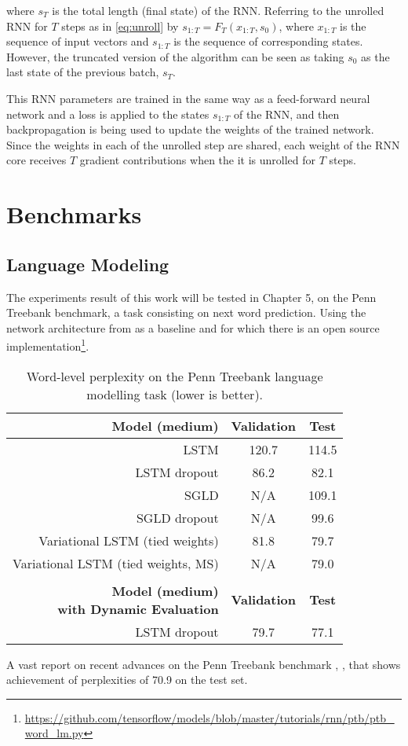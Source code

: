 where $s_T$ is the total length (final state) of the RNN.
Referring to the unrolled RNN for $T$ steps as in \eqref{eq:unroll} by $s_{1:T} = F_T(x_{1:T}, s_0)$,
where $x_{1:T}$ is the sequence of input vectors and $s_{1:T}$ is the sequence of corresponding states. However, the truncated version of the algorithm can be seen as taking $s_0$ as the last state of the previous batch, $s_T$.

This RNN parameters are trained in the same way as a feed-forward neural network and a loss is applied to the states $s_{1:T}$ of the RNN, and then backpropagation is being used to update the weights of the trained network.
Since the weights in each of the unrolled step are shared, each weight of the RNN core receives $T$ gradient contributions when the it is unrolled for $T$ steps.

\section{Benchmarks}

\subsection{Language Modeling}
The experiments result of this work will be tested in Chapter 5, on the Penn Treebank \cite{Marcus1993} benchmark, a task consisting on next word prediction. Using the network architecture from \cite{Zaremba2014} as a baseline and for which there is an open source implementation\footnote{\url{https://github.com/tensorflow/models/blob/master/tutorials/rnn/ptb/ptb_word_lm.py}}.

\begin{table}[t]
	\caption{Word-level perplexity on the Penn Treebank language modelling task (lower is better).}
	\label{tab:ptb}
	\vskip 0.15in
	\centering
	\small
	\begin{tabular}{r|c|c}
		\textbf{Model (medium)}             & \textbf{Validation} & \textbf{Test} \\ 
		\hline
		\abovespace
		LSTM & 120.7 & 114.5\\
		LSTM dropout                        & 	86.2	        &	82.1 \\
		SGLD    	                        &	N/A				&	109.1		\\
		SGLD dropout	                    &	N/A				&	99.6		\\
		Variational LSTM (tied weights)     &	81.8        	&	79.7 \\
		Variational LSTM (tied weights, MS)	&	N/A		        &	79.0		\\
		\hline 
		& &  \\
		\shortstack{\textbf{Model (medium)} \\ \textbf{with Dynamic Evaluation}}
		& \textbf{Validation} & \textbf{Test} \\
		\hline
		\abovespace
		LSTM dropout                      & 	79.7	        &	77.1 \\
		\hline
	\end{tabular}
	\vskip -0.1in
\end{table}

A vast report on recent advances on the Penn Treebank benchmark \cite{Kim2016}, \cite{Zilly2016}, \cite{Merity2016} that shows achievement of perplexities of 70.9 on the test set.